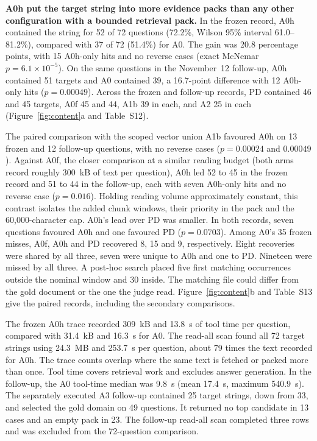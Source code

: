 \textbf{A0h put the target string into more evidence packs than any other
configuration with a bounded retrieval pack.} In
the frozen record, A0h contained the string for 52 of 72 questions (72.2\%,
Wilson 95\% interval 61.0--81.2\%), compared with 37 of 72 (51.4\%) for A0.
The gain was 20.8 percentage points, with 15 A0h-only hits and no reverse
cases (exact McNemar $p=6.1\times10^{-5}$). On the same questions in the
November~12 follow-up, A0h contained 51 targets and A0 contained 39, a
16.7-point difference with 12 A0h-only hits ($p=0.00049$).
Across the frozen and follow-up records, PD contained 46 and 45
targets, A0f 45 and 44, A1b 39 in each, and A2 25 in each
(Figure~\ref{fig:content}a and Table~S12).

The paired comparison with the scoped vector union A1b favoured A0h on
13 frozen and 12 follow-up questions, with no reverse cases
($p=0.00024$ and $0.00049$). Against A0f, the closer comparison at a
similar reading budget (both arms record roughly 300~kB of text per
question), A0h led 52 to 45 in the frozen record and 51 to 44 in the
follow-up, each with seven A0h-only hits and no reverse case ($p=0.016$).
Holding reading volume approximately constant, this contrast isolates
the added chunk windows, their priority in the pack and the
60{,}000-character cap. A0h's lead over PD was smaller. In both
records, seven questions favoured A0h and one favoured PD
($p=0.0703$). Among A0's 35 frozen misses, A0f, A0h and PD recovered
8, 15 and 9, respectively. Eight recoveries were shared by all three,
seven were unique to A0h and one to PD. Nineteen were missed by all three.
A post-hoc search placed five first matching occurrences outside the
nominal window and 30 inside. The matching file could differ from the gold
document or the one the judge read. Figure~\ref{fig:content}b and Table~S13
give the paired records, including the secondary comparisons.

The frozen A0h trace recorded 309~kB and 13.8~s of tool time per question, compared with
31.4~kB and 16.3~s for A0. The read-all scan found all 72 target strings
using 24.3~MB and 253.7~s per question, about 79 times the text recorded
for A0h. The trace counts overlap where the same text is fetched or packed
more than once. Tool time covers retrieval work and excludes answer
generation. In the follow-up, the A0 tool-time median was 9.8~s
(mean 17.4~s, maximum 540.9~s). The separately executed A3 follow-up
contained 25 target strings, down from 33, and selected the gold domain
on 49 questions. It returned no top candidate in 13 cases and an empty
pack in 23. The follow-up read-all scan completed three rows and was
excluded from the 72-question comparison.

